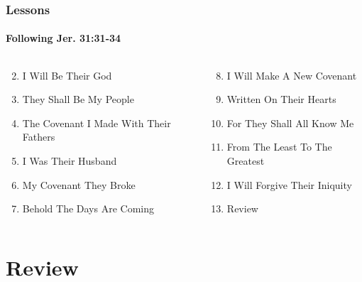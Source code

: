 \begin{frame}
\frametitle{Lessons}
\framesubtitle{Following Jer. 31:31-34}
\begin{columns}[T]
\begin{column}{0.5\textwidth}
\begin{enumerate}
\setcounter{enumi}{1}
\item  I Will Be Their God 
\item  They Shall Be My People 
\item  The Covenant I Made With Their Fathers 
\item  I Was Their Husband 
\item  My Covenant They Broke 
\item  Behold The Days Are Coming 
\end{enumerate}
\end{column}
\begin{column}{0.5\textwidth}
\begin{enumerate}
\setcounter{enumi}{7}
\item  I Will Make A New Covenant 

\item  Written On Their Hearts 

\item  For They Shall All Know Me 

\item  From The Least To The Greatest 

\item  I Will Forgive Their Iniquity 

\item  Review 
\end{enumerate}
\end{column}
\end{columns}
\end{frame}

\section{Review}


